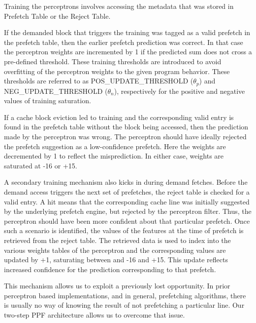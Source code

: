 \newline

Training the perceptrons involves accessing the metadata
that was stored in Prefetch Table or the Reject Table.  

If the demanded block that triggers the training was tagged as a valid
prefetch in the prefetch table, then the earlier prefetch prediction was
correct.  In that case the perceptron weights are incremented by 1 if the
predicted sum does not cross a pre-defined threshold. These training
thresholds are introduced to avoid overfitting of the perceptron weights to
the given program behavior. These thresholds are referred to as
POS\_UPDATE\_THRESHOLD ($\theta_p$) and \newline
NEG\_UPDATE\_THRESHOLD ($\theta_n$),
respectively for the positive and negative values of training saturation.

If a cache block eviction led to training and the corresponding valid entry is
found in the prefetch table without the block being accessed, then the
prediction made by the perceptron was wrong.  The perceptron should have
ideally rejected the prefetch suggestion as a low-confidence prefetch.  Here
the weights are decremented by 1 to reflect the misprediction. In either case,
weights are saturated at -16 or +15.

A secondary training mechanism also kicks in during demand fetches.  Before
the demand access triggers the next set of prefetches, the reject table is
checked for a valid entry.  A hit means that the corresponding cache line was
initially suggested by the underlying prefetch engine, but rejected by the
perceptron filter.  Thus, the perceptron should have been more confident about
that particular prefetch.  Once such a scenario is identified, the values of
the features at the time of prefetch is retrieved from the reject table.  The
retrieved data is used to index into the various weights tables of the
perceptron and the corresponding values are updated by +1, saturating between
and -16 and +15.  This update reflects increased confidence for the prediction
corresponding to that prefetch.

This mechanism allows us to exploit a previously lost opportunity.  In prior
perceptron based implementations, and in general, prefetching algorithms,
there is usually no way of knowing the result of not prefetching a particular
line.  Our two-step PPF architecture allows us to overcome that issue.

